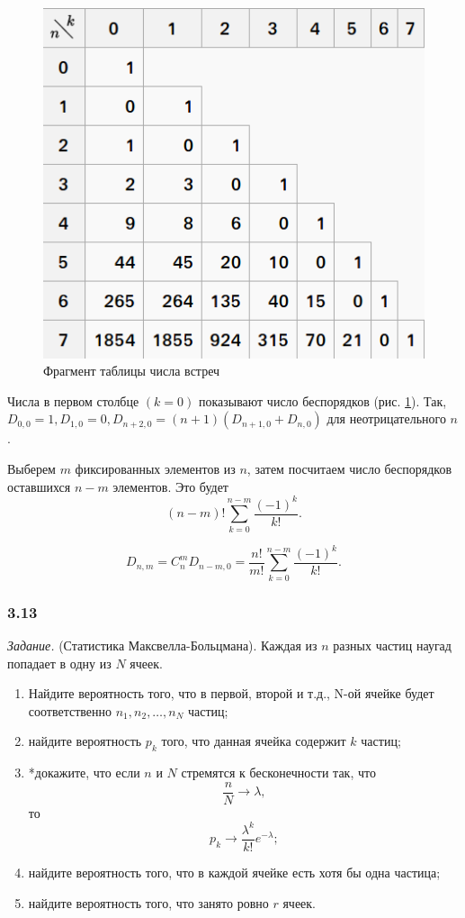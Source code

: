 \begin{enumerate}[label=\alph*)]
\begin{figure}[h!]
  \centering
  \includegraphics[width=.7\textwidth]{./pictures/3_12.png}
  \caption{Фрагмент таблицы числа встреч}
  \label{fig:312}
\end{figure}

Числа в первом столбце $ \left( k=0 \right) $ показывают число беспорядков (рис. \ref{fig:312}).
Так,
$D_{0, 0} = 1, D_{1, 0} = 0, D_{n+2, 0} = \left( n+1 \right) \left( D_{n+1, 0} + D_{n, 0} \right)$ для неотрицательного $n$.

Выберем $m$ фиксированных элементов из $n$, затем посчитаем число беспорядков оставшихся $n - m$ элементов.
Это будет
$$ \left( n-m \right)! \sum \limits_{k=0}^{n-m} \frac{ \left( -1 \right)^k}{k!}.$$

$$D_{n ,m} =
C_n^m D_{n-m, 0} =
\frac{n!}{m!} \sum \limits_{k=0}^{n-m} \frac{ \left( -1 \right)^k}{k!}.$$
\end{enumerate}

\subsubsection*{3.13}

\textit{Задание.} (Статистика Максвелла-Больцмана). Каждая из $n$ разных частиц наугад попадает в одну из $N$ ячеек.
\begin{enumerate}[label=\alph*)]
\item Найдите вероятность того, что в первой, второй и т.д., N-ой ячейке будет соответственно $n_1, n_2, \dotsc, n_N$ частиц;
\item найдите вероятность $p_k$ того, что данная ячейка содержит $k$ частиц;
\item *докажите, что если $n$ и $N$ стремятся к бесконечности так, что
$$ \frac{n}{N} \rightarrow \lambda,$$
то
$$p_k \rightarrow \frac{ \lambda^k}{k!}e^{- \lambda};$$
\item найдите вероятность того, что в каждой ячейке есть хотя бы одна частица;
\item найдите вероятность того, что занято ровно $r$ ячеек.
\end{enumerate}

